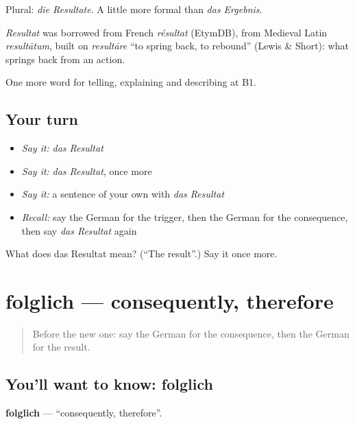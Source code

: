 Plural: \emph{die Resultate}. A little more formal than \emph{das Ergebnis}.

\begin{cousinweb}
\emph{Resultat} was borrowed from French \emph{résultat} (EtymDB), from Medieval Latin \emph{resultātum}, built on \emph{resultāre} \textquotedblleft{}to spring back, to rebound\textquotedblright{} (Lewis \& Short): what springs back from an action.
\end{cousinweb}

\begin{grammarlens}[title={What you've built}]
One more word for telling, explaining and describing at B1.
\end{grammarlens}

\subsection*{Your turn}
\begin{itemize}
\raggedright
  \item \emph{Say it:} \emph{das Resultat}
  \item \emph{Say it:} \emph{das Resultat}, once more
  \item \emph{Say it:} a sentence of your own with \emph{das Resultat}
  \item \emph{Recall:} say the German for the trigger, then the German for the consequence, then say \emph{das Resultat} again
\end{itemize}

\begin{tcolorbox}[breakable,colback=teal!4,colframe=teal!35!black,title={Before you move on}]
What does das Resultat mean? (\textquotedblleft{}The result\textquotedblright{}.) Say it once more.
\end{tcolorbox}
\section[folglich]{folglich — consequently, therefore}

\label{lesson:GE-C343-folglich}



\begin{quote}
Before the new one: say the German for the consequence, then the German for the result.
\end{quote}

\subsection*{You'll want to know: folglich}
\textbf{folglich} — \textquotedblleft{}consequently, therefore\textquotedblright{}.

